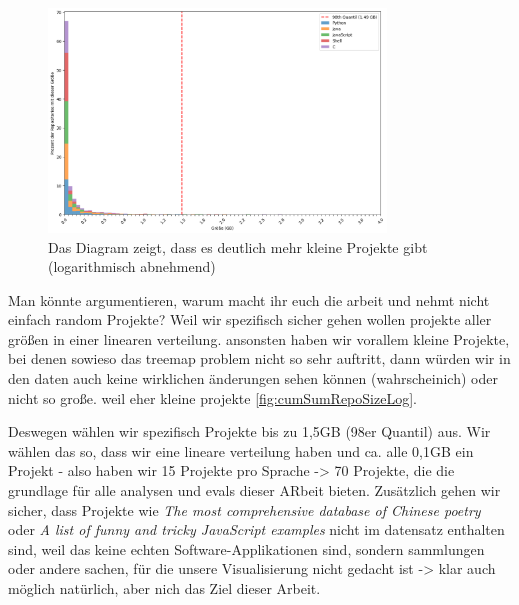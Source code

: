 \begin{figure}
    \centering
    \includegraphics[width=0.8\textwidth]{images/datenanalyse/repoSizeUnfilteredVerteilung.png}
    \caption{Das Diagram zeigt, dass es deutlich mehr kleine Projekte gibt (logarithmisch abnehmend)}
    \label{fig:repoGroesseVerteilungUnfiltered}
\end{figure}

Man könnte argumentieren, warum macht ihr euch die arbeit und nehmt nicht einfach random Projekte? Weil wir spezifisch sicher gehen wollen projekte aller größen in einer linearen verteilung. ansonsten haben wir vorallem kleine Projekte, bei denen sowieso das treemap problem nicht so sehr auftritt, dann würden wir in den daten auch keine wirklichen änderungen sehen können (wahrscheinich) oder nicht so große. weil eher kleine projekte \ref{fig:cumSumRepoSizeLog}.

Deswegen wählen wir spezifisch Projekte bis zu 1,5GB (98er Quantil) aus. Wir wählen das so, dass wir eine lineare verteilung haben und ca. alle 0,1GB ein Projekt - also haben wir 15 Projekte pro Sprache -> 70 Projekte, die die grundlage für alle analysen und evals dieser ARbeit bieten. 
Zusätzlich gehen wir sicher, dass Projekte  wie \textit{The most comprehensive database of Chinese poetry} oder \textit{A list of funny and tricky JavaScript examples} nicht im datensatz enthalten sind, weil das keine echten Software-Applikationen sind, sondern sammlungen oder andere sachen, für die unsere Visualisierung nicht gedacht ist -> klar auch möglich natürlich, aber nich das Ziel dieser Arbeit.

